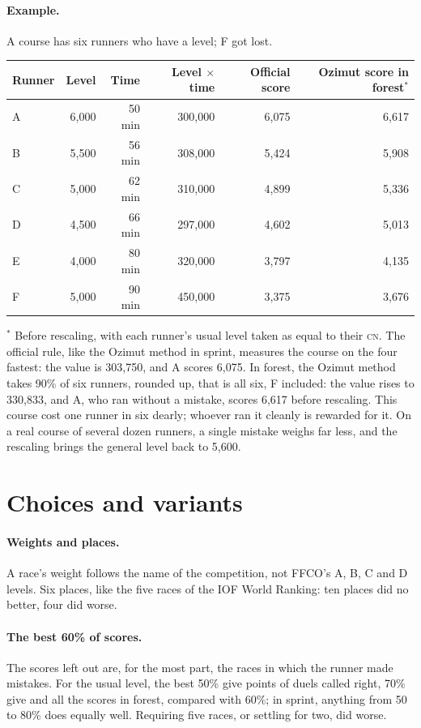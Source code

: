 \documentclass[11pt,a4paper]{article}
\newcommand{\CN}{\textsc{cn}}
\begin{document}
\paragraph{Example.} A course has six runners who have a level; F got lost.
\begin{center}\small
\begin{tabular}{@{}lrrrrr@{}}\toprule
Runner & Level & Time & Level $\times$ time & Official score & Ozimut score in forest$^*$ \\ \midrule
A & 6,000 & 50 min & 300,000 & 6,075 & 6,617 \\
B & 5,500 & 56 min & 308,000 & 5,424 & 5,908 \\
C & 5,000 & 62 min & 310,000 & 4,899 & 5,336 \\
D & 4,500 & 66 min & 297,000 & 4,602 & 5,013 \\
E & 4,000 & 80 min & 320,000 & 3,797 & 4,135 \\
F & 5,000 & 90 min & 450,000 & 3,375 & 3,676 \\ \bottomrule
\end{tabular}
\end{center}
$^*$ Before rescaling, with each runner's usual level taken as equal to their \CN. The official rule, like the Ozimut method in sprint, measures the course on the four fastest: the value is 303,750, and A scores 6,075. In forest, the Ozimut method takes 90\% of six runners, rounded up, that is all six, F included: the value rises to 330,833, and A, who ran without a mistake, scores 6,617 before rescaling. This course cost one runner in six dearly; whoever ran it cleanly is rewarded for it. On a real course of several dozen runners, a single mistake weighs far less, and the rescaling brings the general level back to 5,600.

\section{Choices and variants}

\paragraph{Weights and places.} A race's weight follows the name of the competition, not FFCO's A, B, C and D levels. Six places, like the five races of the IOF World Ranking: ten places did no better, four did worse.

\paragraph{The best 60\% of scores.} The scores left out are, for the most part, the races in which the runner made mistakes. For the usual level, the best 50\% give \NeligFifty{} points of duels called right, 70\% give \NeligSeventy{} and all the scores \NeligAll{} in forest, compared with 60\%; in sprint, anything from 50 to 80\% does equally well. Requiring five races, or settling for two, did worse.
\end{document}
